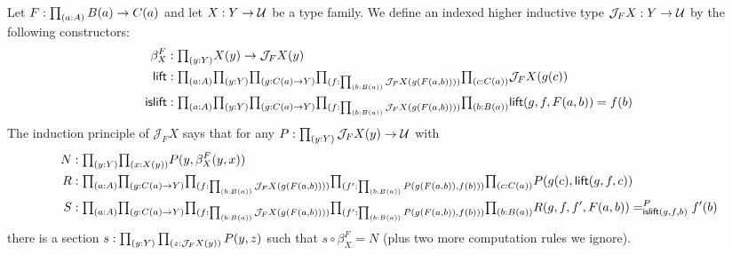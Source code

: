 Let $F:\prd{a:A} B(a) \to C(a)$ and let $X:Y\to\mathcal{U}$ be a type family.
We define an indexed higher inductive type $\mathcal{J}_F X : Y\to \mathcal{U}$ by the following constructors:
\begin{align*}
\beta^F_X &: \prd{y:Y} X(y) \to \mathcal{J}_F X(y)\\
\mathsf{lift} &: \prd{a:A}{y:Y}{g:C(a) \to Y}{f:\prd{b:B(a)} \mathcal{J}_F X(g(F(a,b)))}{c:C(a)} \mathcal{J}_F X(g(c))\\
\mathsf{islift} &
: \prd{a:A}{y:Y}{g:C(a) \to Y}{f:\prd{b:B(a)} \mathcal{J}_F X(g(F(a,b)))}{b:B(a)}
\mathsf{lift}(g,f,F(a,b)) = f(b)
\end{align*}
The induction principle of $\mathcal{J}_F X$ says that for any $P:\prd{y:Y} \mathcal{J}_F X(y) \to \UU$ with
\begin{align*}
N &: \prd{y:Y}{x:X(y)} P(y,\beta^F_X(y,x))\\
R &: \prd{a:A}{g:C(a) \to Y}{f:\prd{b:B(a)} \mathcal{J}_F X(g(F(a,b)))}
  \prd{f':\prd{b:B(a)} P(g(F(a,b)),f(b))}{c:C(a)} P(g(c),\mathsf{lift}(g,f,c))\\
S &
: \prd{a:A}{g:C(a) \to Y}{f:\prd{b:B(a)} \mathcal{J}_F X(g(F(a,b)))}
  \prd{f':\prd{b:B(a)} P(g(F(a,b)),f(b))}{b:B(a)} \dpath{P}{\mathsf{islift}(g,f,b)}{R(g,f,f',F(a,b))}{f'(b)}
\end{align*}
there is a section $s:\prd{y:Y}{z:\mathcal{J}_F X(y)} P(y,z)$ such that $s \circ \beta^F_X = N$ (plus two more computation rules we ignore).

